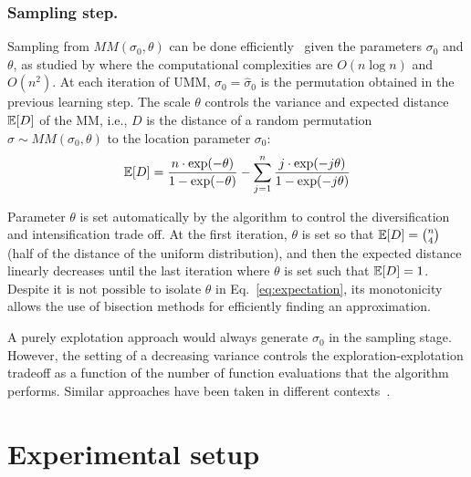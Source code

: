 \documentclass[runningheads]{llncs}
\begin{document}
\subsubsection{Sampling step.}\label{sec:sampling}
Sampling from $MM(\sigma_0,\theta)$  can be done efficiently~\cite{IruCalLoz2016permallows} given the parameters  $\sigma_0$ and $\theta$, as studied by \citet{Collas,IruCalLoz2016permallows,DoiPekReg2004rank} where the computational complexities are $O(n\log n)$ and $O(n^2)$.
%
At each iteration of UMM, $\sigma_0=\hat\sigma_0$ is the permutation obtained in the previous learning step. The scale $\theta$ controls the variance and expected distance $\mathbb{E}[D]$ of the MM, i.e., $D$ is the distance of a random permutation $\sigma\sim MM(\sigma_0, \theta)$ to the location parameter $\sigma_0$:
%
\begin{equation}\label{eq:expectation}
\mathbb{E}[D] = \frac{n \cdot \exp(-\theta)}{1-\exp(-\theta)} - \sum_{j=1}^{n}  \frac{j\cdot\exp(-j  \theta)}{1-\exp(-j\theta)}
\end{equation}

Parameter $\theta$ is set automatically by the algorithm to control the diversification and intensification trade off. At the first iteration, $\theta$ is set so that  $\mathbb{E}[D] = \binom{n}{4}$ (half of the distance of the uniform distribution), and then the expected distance linearly decreases until the last iteration where $\theta$ is set such that $\mathbb{E}[D] = 1$. Despite it is not possible to isolate $\theta$ in Eq.~\eqref{eq:expectation}, its monotonicity allows the use of bisection methods for efficiently finding an approximation. 

A purely explotation approach would always generate $\sigma_0$ in the sampling stage. However, the setting of a decreasing variance   controls the exploration-explotation tradeoff as a function of the number of function evaluations that the algorithm performs.  Similar approaches have been taken in different contexts~\cite{ArzCebPer2019qap}.





\section{Experimental setup}
\end{document}
